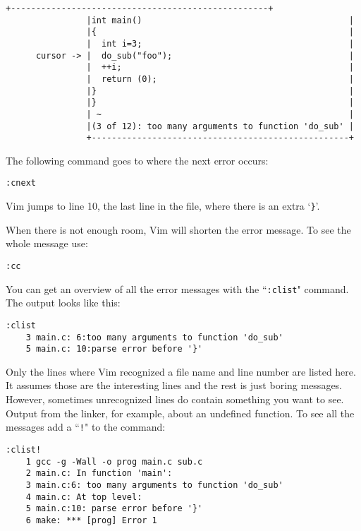 \begin{Verbatim}[samepage=true]
                +---------------------------------------------------+
                |int main()                                         |
                |{                                                  |
                |  int i=3;                                         |
      cursor -> |  do_sub("foo");                                   |
                |  ++i;                                             |
                |  return (0);                                      |
                |}                                                  |
                |}                                                  |
                | ~                                                 |
                |(3 of 12): too many arguments to function 'do_sub' |
                +---------------------------------------------------+
\end{Verbatim}

The following command goes to where the next error occurs:

\begin{Verbatim}[samepage=true]
 :cnext
\end{Verbatim}

Vim jumps to line 10, the last line in the file, where there is an extra `\texttt{\}}'.

When there is not enough room, Vim will shorten the error message.
To see the whole message use:

\begin{Verbatim}[samepage=true]
 :cc
\end{Verbatim}

You can get an overview of all the error messages with the ``\texttt{:clist}" command.
The output looks like this:

\begin{Verbatim}[samepage=true]
 :clist
    3 main.c: 6:too many arguments to function 'do_sub' 
    5 main.c: 10:parse error before '}' 
\end{Verbatim}

Only the lines where Vim recognized a file name and line number are listed here.
It assumes those are the interesting lines and the rest is just boring messages.
However, sometimes unrecognized lines do contain something you want to see.
Output from the linker, for example, about an undefined function.
To see all the messages add a ``\texttt{!}" to the command:

\begin{Verbatim}[samepage=true]
 :clist!
    1 gcc -g -Wall -o prog main.c sub.c 
    2 main.c: In function 'main': 
    3 main.c:6: too many arguments to function 'do_sub' 
    4 main.c: At top level: 
    5 main.c:10: parse error before '}' 
    6 make: *** [prog] Error 1 
\end{Verbatim}

